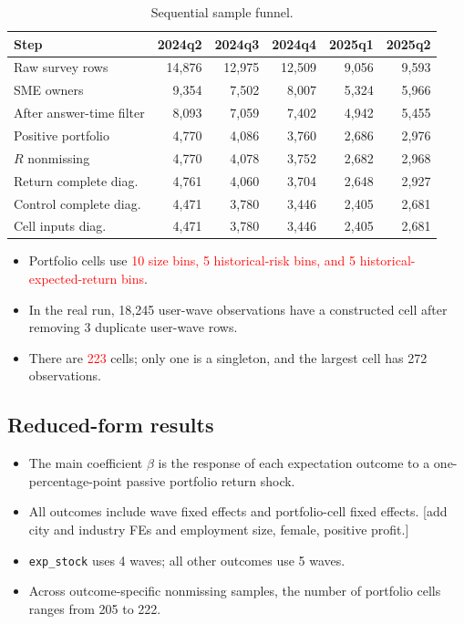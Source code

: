 \documentclass[11pt,letterpaper,english,final]{article}
\begin{document}
\begin{table}[H]
\centering
\scriptsize
\setlength{\tabcolsep}{3.5pt}
\caption{Sequential sample funnel.}
\label{tab:rf_sample_funnel_20260901}
\begin{tabular}{lrrrrr}
\toprule
Step & 2024q2 & 2024q3 & 2024q4 & 2025q1 & 2025q2 \\
\midrule
Raw survey rows & 14{,}876 & 12{,}975 & 12{,}509 & 9{,}056 & 9{,}593 \\
SME owners & 9{,}354 & 7{,}502 & 8{,}007 & 5{,}324 & 5{,}966 \\
After answer-time filter & 8{,}093 & 7{,}059 & 7{,}402 & 4{,}942 & 5{,}455 \\
Positive portfolio & 4{,}770 & 4{,}086 & 3{,}760 & 2{,}686 & 2{,}976 \\
$R$ nonmissing & 4{,}770 & 4{,}078 & 3{,}752 & 2{,}682 & 2{,}968 \\
Return complete diag. & 4{,}761 & 4{,}060 & 3{,}704 & 2{,}648 & 2{,}927 \\
Control complete diag. & 4{,}471 & 3{,}780 & 3{,}446 & 2{,}405 & 2{,}681 \\
Cell inputs diag. & 4{,}471 & 3{,}780 & 3{,}446 & 2{,}405 & 2{,}681 \\
\bottomrule
\end{tabular}
\end{table}

\begin{itemize}
\item Portfolio cells use \textcolor{red}{10 size bins, 5 historical-risk bins, and 5 historical-expected-return bins}.
\item In the real run, 18{,}245 user-wave observations have a constructed cell after removing 3 duplicate user-wave rows.
\item There are \textcolor{red}{223} cells; only one is a singleton, and the largest cell has 272 observations.
\end{itemize}

\subsection{Reduced-form results}

\begin{itemize}
\item The main coefficient $\beta$ is the response of each expectation outcome to a one-percentage-point passive portfolio return shock.
\item All outcomes include wave fixed effects and portfolio-cell fixed effects. {\color{cyan} [add city and industry FEs and employment size, female, positive profit.]}
\item \texttt{exp\_stock} uses 4 waves; all other outcomes use 5 waves.
\item Across outcome-specific nonmissing samples, the number of portfolio cells ranges from 205 to 222.
\end{itemize}
\end{document}
